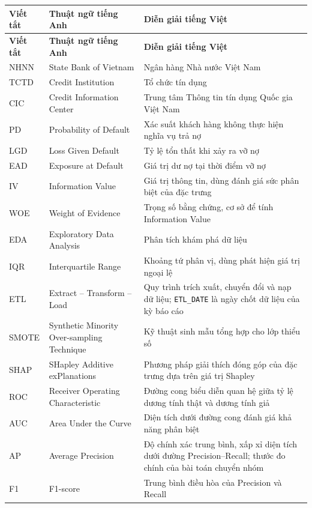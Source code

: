\documentclass[a4paper]{report}
\begin{document}
{\small
\begin{longtable}{|p{2.0cm}|p{4.6cm}|p{6.8cm}|}
\hline
\textbf{Viết tắt} & \textbf{Thuật ngữ tiếng Anh} & \textbf{Diễn giải tiếng Việt}\\
\hline
\endfirsthead
\hline
\textbf{Viết tắt} & \textbf{Thuật ngữ tiếng Anh} & \textbf{Diễn giải tiếng Việt}\\
\hline
\endhead
NHNN & State Bank of Vietnam & Ngân hàng Nhà nước Việt Nam\\ \hline
TCTD & Credit Institution & Tổ chức tín dụng\\ \hline
CIC & Credit Information Center & Trung tâm Thông tin tín dụng Quốc gia Việt Nam\\ \hline
PD & Probability of Default & Xác suất khách hàng không thực hiện nghĩa vụ trả nợ\\ \hline
LGD & Loss Given Default & Tỷ lệ tổn thất khi xảy ra vỡ nợ\\ \hline
EAD & Exposure at Default & Giá trị dư nợ tại thời điểm vỡ nợ\\ \hline
IV & Information Value & Giá trị thông tin, dùng đánh giá sức phân biệt của đặc trưng\\ \hline
WOE & Weight of Evidence & Trọng số bằng chứng, cơ sở để tính Information Value\\ \hline
EDA & Exploratory Data Analysis & Phân tích khám phá dữ liệu\\ \hline
IQR & Interquartile Range & Khoảng tứ phân vị, dùng phát hiện giá trị ngoại lệ\\ \hline
ETL & Extract -- Transform -- Load & Quy trình trích xuất, chuyển đổi và nạp dữ liệu; \texttt{ETL\_DATE} là ngày chốt dữ liệu của kỳ báo cáo\\ \hline
SMOTE & Synthetic Minority Over-sampling Technique & Kỹ thuật sinh mẫu tổng hợp cho lớp thiểu số\\ \hline
SHAP & SHapley Additive exPlanations & Phương pháp giải thích đóng góp của đặc trưng dựa trên giá trị Shapley\\ \hline
ROC & Receiver Operating Characteristic & Đường cong biểu diễn quan hệ giữa tỷ lệ dương tính thật và dương tính giả\\ \hline
AUC & Area Under the Curve & Diện tích dưới đường cong đánh giá khả năng phân biệt\\ \hline
AP & Average Precision & Độ chính xác trung bình, xấp xỉ diện tích dưới đường Precision--Recall; thước đo chính của bài toán chuyển nhóm\\ \hline
F1 & F1-score & Trung bình điều hòa của Precision và Recall\\ \hline

\end{longtable}}
\end{document}

